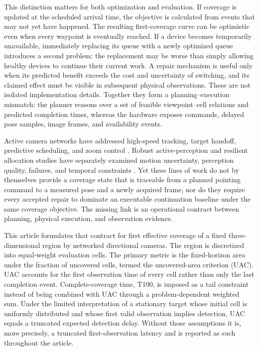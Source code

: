 This distinction matters for both optimization and evaluation. If coverage is updated at the scheduled arrival time, the objective is calculated from events that may not yet have happened. The resulting first-coverage curve can be optimistic even when every waypoint is eventually reached. If a device becomes temporarily unavailable, immediately replacing its queue with a newly optimized queue introduces a second problem: the replacement may be worse than simply allowing healthy devices to continue their current work. A repair mechanism is useful only when its predicted benefit exceeds the cost and uncertainty of switching, and its claimed effect must be visible in subsequent physical observations. These are not isolated implementation details. Together they form a planning--execution mismatch: the planner reasons over a set of feasible viewpoint--cell relations and predicted completion times, whereas the hardware exposes commands, delayed pose samples, image frames, and availability events.

Active camera networks have addressed high-speed tracking, target handoff, predictive scheduling, and zoom control \cite{e2024wisecam,jiang2021pan,zhang2026capture}. Robust active-perception and resilient allocation studies have separately examined motion uncertainty, perception quality, failures, and temporal constraints \cite{xanthidis2024resivis,choudhury2022dynamic,notomista2022resilient}. Yet these lines of work do not by themselves provide a coverage state that is traceable from a planned pointing command to a measured pose and a newly acquired frame, nor do they require every accepted repair to dominate an executable continuation baseline under the same coverage objective. The missing link is an operational contract between planning, physical execution, and observation evidence.

This article formulates that contract for first effective coverage of a fixed three-dimensional region by networked directional cameras. The region is discretized into equal-weight evaluation cells. The primary metric is the fixed-horizon area under the fraction of uncovered cells, termed the uncovered-area criterion (UAC). UAC accounts for the first observation time of every cell rather than only the last completion event. Complete-coverage time, T100, is imposed as a tail constraint instead of being combined with UAC through a problem-dependent weighted sum. Under the limited interpretation of a stationary target whose initial cell is uniformly distributed and whose first valid observation implies detection, UAC equals a truncated expected detection delay. Without those assumptions it is, more precisely, a truncated first-observation latency and is reported as such throughout the article.

